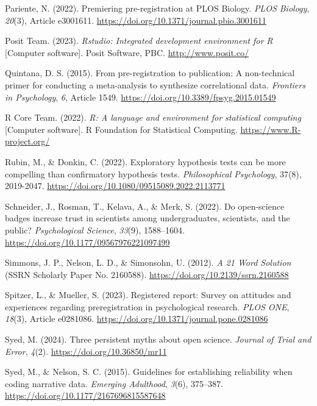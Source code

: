 \documentclass[authordate, meta]{jote-new-article}
\begin{document}
	Pariente, N. (2022). Premiering pre-registration at PLOS Biology. \emph{PLOS Biology}, \emph{20}(3), Article e3001611. \url{https://doi.org/10.1371/journal.pbio.3001611}



	Posit Team. (2023). \emph{Rstudio: Integrated development environment for R} [Computer software]. Posit Software, PBC. \url{http://www.posit.co/}



	Quintana, D. S. (2015). From pre-registration to publication: A non-technical primer for conducting a meta-analysis to synthesize correlational data. \emph{Frontiers in Psychology}, \emph{6}, Article 1549. \url{https://doi.org/10.3389/fpsyg.2015.01549}



	R Core Team. (2022). \emph{R: A language and environment for statistical computing} [Computer software]. R Foundation for Statistical Computing. \url{https://www.R-project.org/}



	Rubin, M., \& Donkin, C. (2022). Exploratory hypothesis tests can be more compelling than confirmatory hypothesis tests. \emph{Philosophical Psychology}, 37(8), 2019-2047. \url{https://doi.org/10.1080/09515089.2022.2113771}



	Schneider, J., Rosman, T., Kelava, A., \& Merk, S. (2022). Do open-science badges increase trust in scientists among undergraduates, scientists, and the public? \emph{Psychological Science}, \emph{33}(9), 1588--1604. \url{https://doi.org/10.1177/09567976221097499}



	Simmons, J. P., Nelson, L. D., \& Simonsohn, U. (2012). \emph{A 21 Word Solution} (SSRN Scholarly Paper No. 2160588). \url{https://doi.org/10.2139/ssrn.2160588}



	Spitzer, L., \& Mueller, S. (2023). Registered report: Survey on attitudes and experiences regarding preregistration in psychological research. \emph{PLOS ONE}, \emph{18}(3), Article e0281086. \url{https://doi.org/10.1371/journal.pone.0281086}



	Syed, M. (2024). Three persistent myths about open science. \emph{Journal of Trial and Error}, \emph{4}(2). \url{https://doi.org/10.36850/mr11}



	Syed, M., \& Nelson, S. C. (2015). Guidelines for establishing reliability when coding narrative data. \emph{Emerging Adulthood}, \emph{3}(6), 375--387. \url{https://doi.org/10.1177/2167696815587648}
\end{document}

